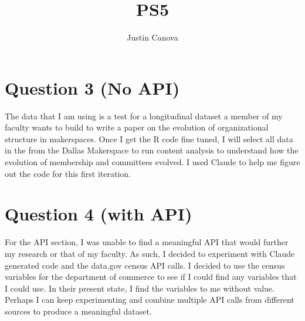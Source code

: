 \documentclass{article}
\title{PS5}
\author{Justin Canova}
\begin{document}
\maketitle



\section{Question 3 (No API)}

The data that I am using is a test for a longitudinal dataset a member of my faculty wants to build to write a paper on the evolution of organizational structure in makerspaces.  Once I get the R code fine tuned, I will select all data in the from the Dallas Makerspace to run content analysis to understand how the evolution of membership and committees evolved.  I used Claude to help me figure out the code for this first iteration.

\section{Question 4 (with API)}
For the API section, I was unable to find a meaningful API that would further my research or that of my faculty.  As such, I decided to experiment with Claude generated code and the data.gov census API calls.  I decided to use the census variables for the department of commerce to see if I could find any variables that I could use.  In their present state, I find the variables to me without value.  Perhaps I can keep experimenting and combine multiple API calls from different sources to produce a meaningful dataset.
\end{document}
